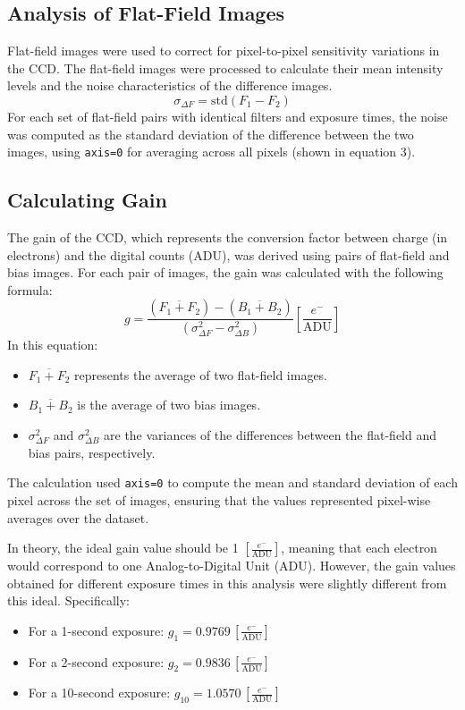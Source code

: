 \documentclass[linenumbers,twocolumn]{aastex631}
\begin{document}
\subsection{Analysis of Flat-Field Images}

Flat-field images were used to correct for pixel-to-pixel sensitivity variations in the CCD. The flat-field images were processed to calculate their mean intensity levels and the noise characteristics of the difference images. 
\begin{equation}
\sigma_{\Delta F} = \text{std}(F_1 - F_2)
\end{equation}
For each set of flat-field pairs with identical filters and exposure times, the noise was computed as the standard deviation of the difference between the two images, using \texttt{axis=0} for averaging across all pixels (shown in equation 3).

\subsection{Calculating Gain}

The gain of the CCD, which represents the conversion factor between charge (in electrons) and the digital counts (ADU), was derived using pairs of flat-field and bias images. For each pair of images, the gain was calculated with the following formula:
\begin{equation}
g = \frac{\left( \overline{F_1 + F_2} \right) - \left( \overline{B_1 + B_2} \right)}{\left( \sigma^2_{\Delta F} - \sigma^2_{\Delta B} \right)} \left[ \frac{e^-}{\text{ADU}} \right]
\end{equation}
In this equation:
\begin{itemize}
    \item \( \overline{F_1 + F_2} \) represents the average of two flat-field images.
    \item \( \overline{B_1 + B_2} \) is the average of two bias images.
    \item \( \sigma^2_{\Delta F} \) and \( \sigma^2_{\Delta B} \) are the variances of the differences between the flat-field and bias pairs, respectively.
\end{itemize}

The calculation used \texttt{axis=0} to compute the mean and standard deviation of each pixel across the set of images, ensuring that the values represented pixel-wise averages over the dataset.

In theory, the ideal gain value should be 1 \( \left[ \frac{e^-}{\text{ADU}} \right] \), meaning that each electron would correspond to one Analog-to-Digital Unit (ADU). However, the gain values obtained for different exposure times in this analysis were slightly different from this ideal. Specifically:
\begin{itemize}
    \item For a 1-second exposure: \( g_1 = 0.9769 \, \left[ \frac{e^-}{\text{ADU}} \right] \)
    \item For a 2-second exposure: \( g_2 = 0.9836 \, \left[ \frac{e^-}{\text{ADU}} \right] \)
    \item For a 10-second exposure: \( g_{10} = 1.0570 \, \left[ \frac{e^-}{\text{ADU}} \right] \)
\end{itemize}
\end{document}

